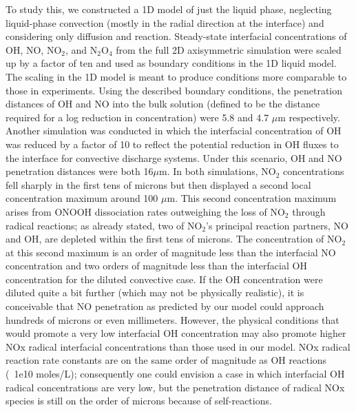 To study this, we constructed a 1D model of just the liquid phase, neglecting liquid-phase convection (mostly in the radial direction at the interface) and considering only diffusion and reaction. Steady-state interfacial concentrations of OH, NO, NO$_2$, and N$_2$O$_4$ from the full 2D axisymmetric simulation were scaled up by a factor of ten and used as boundary conditions in the 1D liquid model. The scaling in the 1D model is meant to produce conditions more comparable to those in experiments. Using the described boundary conditions, the penetration distances of OH and NO into the bulk solution (defined to be the distance required for a log reduction in concentration) were 5.8 and 4.7 $\mu$m respectively. Another simulation was conducted in which the interfacial concentration of OH was reduced by a factor of 10 to reflect the potential reduction in OH fluxes to the interface for convective discharge systems. Under this scenario, OH and NO penetration distances were both 16$\mu$m. In both simulations, NO$_2$ concentrations fell sharply in the first tens of microns but then displayed a second local concentration maximum around 100 $\mu$m. This second concentration maximum arises from ONOOH dissociation rates outweighing the loss of NO$_2$ through radical reactions; as already stated, two of NO$_2$'s principal reaction partners, NO and OH, are depleted within the first tens of microns. The concentration of NO$_2$ at this second maximum is an order of magnitude less than the interfacial NO concentration and two orders of magnitude less than the interfacial OH concentration for the diluted convective case. If the OH concentration were diluted quite a bit further (which may not be physically realistic), it is conceivable that NO penetration as predicted by our model could approach hundreds of microns or even millimeters. However, the physical conditions that would promote a very low interfacial OH concentration may also promote higher NOx radical interfacial concentrations than those used in our model. NOx radical reaction rate constants are on the same order of magnitude as OH reactions (~1e10 moles/L); consequently one could envision a case in which interfacial OH radical concentrations are very low, but the penetration distance of radical NOx species is still on the order of microns because of self-reactions.

